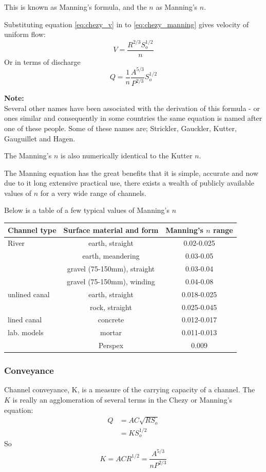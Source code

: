 \documentclass[a4paper, 12pt, british]{article} %
\numberwithin{equation}{section}
\numberwithin{figure}{section}
\numberwithin{table}{section}
\begin{document}
This is known as Manning's formula, and the $n$ as Manning's $n$.

Substituting equation \ref{eq:chezy_v} in to \ref{eq:chezy_manning} gives velocity of uniform flow:
\begin{equation}
V = \frac{R^{2/3}S_o^{1/2}}{n}
\label{eq:manning_v}
\end{equation} 
Or in terms of discharge
\begin{equation}
Q = \frac{1}{n}\frac{A^{5/3}}{P^{2/3}}S_o^{1/2}
\label{eq:manning_q} %
\end{equation} 


\textbf{Note:} \\
Several other names have been associated with the derivation of this formula - or ones similar and consequently in some countries the same equation is named after one of these people. Some of these names are; Strickler, Gauckler, Kutter, Gauguillet and Hagen.

The Manning's $n$ is also numerically identical to the Kutter $n$.

The Manning equation has the great benefits that it is simple, accurate and now due to it long extensive practical use, there exists a wealth of publicly available values of $n$ for a very wide range of channels.

Below is a table of a few typical values of Manning's $n$

\begin{table}[H]
	\centering
	\begin{tabular}{l|c|c}
		\hline
\textbf{Channel type}&\textbf{Surface material and form}&\textbf{Manning's $n$ range }\\
\hline
River&earth, straight&0.02-0.025\\
&earth, meandering&0.03-0.05\\
&gravel (75-150mm), straight&0.03-0.04\\
&gravel (75-150mm), winding&0.04-0.08\\
\hline
unlined canal&earth, straight&0.018-0.025\\
&rock, straight&0.025-0.045\\
\hline
lined canal&concrete&0.012-0.017\\
\hline
lab. models&mortar&0.011-0.013\\
&Perspex& 0.009\\
\hline
\end{tabular}
\end{table}
	
\subsubsection{Conveyance}
Channel conveyance, K, is a measure of the carrying capacity of a channel. The $K$ is really an agglomeration of several terms in the Chezy or Manning's equation:
\begin{align}
Q &= AC\sqrt{R S_o} \nonumber \\
&= KS_o^{1/2}
\label{eq:manning_conveyance}
\end{align} 
 So
\begin{equation}
K = ACR^{1/2} = \frac{A^{5/3}}{n P^{2/3}}
\label{eq:conveyance}
\end{equation} 
\end{document}
